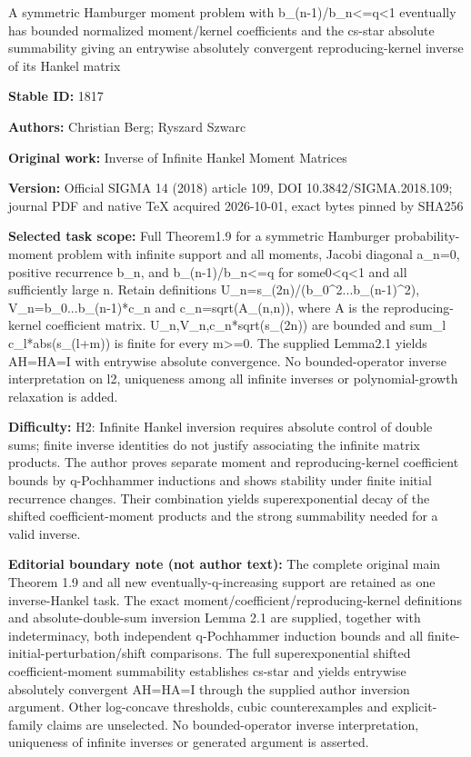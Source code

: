\documentclass[11pt]{article}
\numberwithin{equation}{section}
\begin{document}
\begin{center}\Large A symmetric Hamburger moment problem with b\_(n-1)/b\_n<=\allowbreak{}q<1 eventually has bounded normalized moment/kernel coefficients and the cs-star absolute summability giving an entrywise absolutely convergent reproducing-kernel inverse of its Hankel matrix\end{center}
\noindent\textbf{Stable ID:} 1817\par
\noindent\textbf{Authors:} Christian Berg; Ryszard Szwarc\par
\noindent\textbf{Original work:} Inverse of Infinite Hankel Moment Matrices\par
\noindent\textbf{Version:} Official SIGMA 14 (2018) article 109, DOI 10.3842/SIGMA.2018.109; journal PDF and native TeX acquired 2026-10-01, exact bytes pinned by SHA256\par
\noindent\textbf{Selected task scope:} Full Theorem1.9 for a symmetric Hamburger probability-moment problem with infinite support and all moments, Jacobi diagonal a\_n=\allowbreak{}0, positive recurrence b\_n, and b\_(n-1)/b\_n<=\allowbreak{}q for some0<q<1 and all sufficiently large n. Retain definitions U\_n=\allowbreak{}s\_(2n)/(b\_0\textasciicircum{}2...b\_(n-1)\textasciicircum{}2), V\_n=\allowbreak{}b\_0...b\_(n-1)*\allowbreak{}c\_n and c\_n=\allowbreak{}sqrt(A\_(n,n)), where A is the reproducing-kernel coefficient matrix. U\_n,V\_n,c\_n*\allowbreak{}sqrt(s\_(2n)) are bounded and sum\_l c\_l*\allowbreak{}abs(s\_(l+\allowbreak{}m)) is finite for every m>=\allowbreak{}0. The supplied Lemma2.1 yields AH=\allowbreak{}HA=\allowbreak{}I with entrywise absolute convergence. No bounded-operator inverse interpretation on l2, uniqueness among all infinite inverses or polynomial-growth relaxation is added.\par
\noindent\textbf{Difficulty:} H2: Infinite Hankel inversion requires absolute control of double sums; finite inverse identities do not justify associating the infinite matrix products. The author proves separate moment and reproducing-kernel coefficient bounds by q-Pochhammer inductions and shows stability under finite initial recurrence changes. Their combination yields superexponential decay of the shifted coefficient-moment products and the strong summability needed for a valid inverse.\par
\noindent\textbf{Editorial boundary note (not author text):} The complete original main Theorem 1.9 and all new eventually-q-increasing support are retained as one inverse-Hankel task. The exact moment/coefficient/reproducing-kernel definitions and absolute-double-sum inversion Lemma 2.1 are supplied, together with indeterminacy, both independent q-Pochhammer induction bounds and all finite-initial-perturbation/shift comparisons. The full superexponential shifted coefficient-moment summability establishes cs-star and yields entrywise absolutely convergent AH=\allowbreak{}HA=\allowbreak{}I through the supplied author inversion argument. Other log-concave thresholds, cubic counterexamples and explicit-family claims are unselected. No bounded-operator inverse interpretation, uniqueness of infinite inverses or generated argument is asserted.\par
\end{document}

